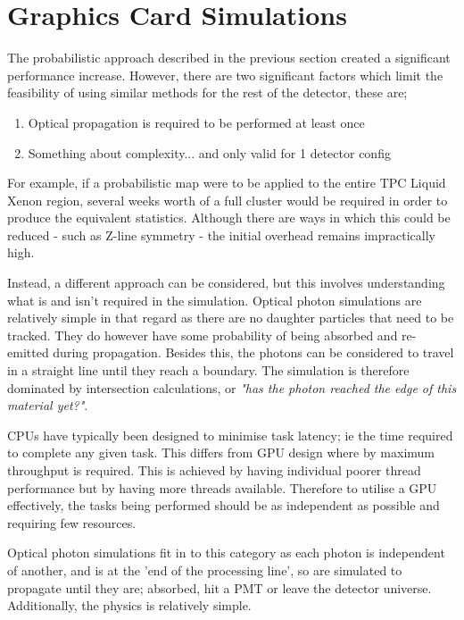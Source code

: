 \section{Graphics Card Simulations}

\par
The probabilistic approach described in the previous section created a significant performance increase. 
However, there are two significant factors which limit the feasibility of using similar methods for the rest of the detector, these are;
\begin{enumerate}
    \item Optical propagation is required to be performed at least once
    \item Something about complexity... and only valid for 1 detector config
\end{enumerate}
For example, if a probabilistic map were to be applied to the entire TPC Liquid Xenon region, several weeks worth of a full cluster would be required in order to produce the equivalent statistics.
Although there are ways in which this could be reduced - such as Z-line symmetry - the initial overhead remains impractically high.

\par
Instead, a different approach can be considered, but this involves understanding what is and isn't required in the simulation.
Optical photon simulations are relatively simple in that regard as there are no daughter particles that need to be tracked.
They do however have some probability of being absorbed and re-emitted during propagation.
Besides this, the photons can be considered to travel in a straight line until they reach a boundary.
The simulation is therefore dominated by intersection calculations, or \textit{"has the photon reached the edge of this material yet?"}.

\par
CPUs have typically been designed to minimise task latency; ie the time required to complete any given task.
This differs from GPU design where by maximum throughput is required. 
This is achieved by having individual poorer thread performance but by having more threads available.
Therefore to utilise a GPU effectively, the tasks being performed should be as independent as possible and requiring few resources.

\par
Optical photon simulations fit in to this category as each photon is independent of another, and is at the 'end of the processing line', so are simulated to propagate until they are; absorbed, hit a PMT or leave the detector universe.
Additionally, the physics is relatively simple.


